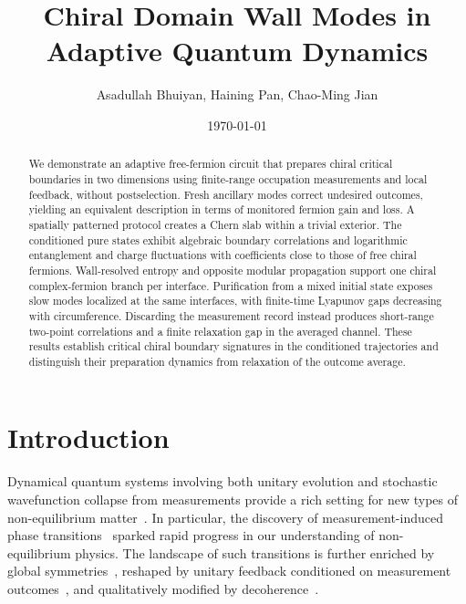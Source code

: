 \documentclass[aps,prb,10pt,twocolumn,superscriptaddress,longbibliography,floatfix]{revtex4-2}
\newcommand{\newtext}[1]{{\color{blue}#1}}
\begin{document}
\raggedbottom

\title{Chiral Domain Wall Modes in Adaptive Quantum Dynamics}
\author{Asadullah Bhuiyan, Haining Pan, Chao-Ming Jian}
\noaffiliation
\date{\today}

\begin{abstract}
\newtext{We demonstrate an adaptive free-fermion circuit that prepares chiral critical boundaries in two dimensions using finite-range occupation measurements and local feedback, without postselection. Fresh ancillary modes correct undesired outcomes, yielding an equivalent description in terms of monitored fermion gain and loss. A spatially patterned protocol creates a Chern slab within a trivial exterior. The conditioned pure states exhibit algebraic boundary correlations and logarithmic entanglement and charge fluctuations with coefficients close to those of free chiral fermions. Wall-resolved entropy and opposite modular propagation support one chiral complex-fermion branch per interface. Purification from a mixed initial state exposes slow modes localized at the same interfaces, with finite-time Lyapunov gaps decreasing with circumference. Discarding the measurement record instead produces short-range two-point correlations and a finite relaxation gap in the averaged channel. These results establish critical chiral boundary signatures in the conditioned trajectories and distinguish their preparation dynamics from relaxation of the outcome average.}
\end{abstract}

\maketitle

\setcounter{tocdepth}{2}
\tableofcontents

\section{Introduction}

Dynamical quantum systems involving both unitary evolution and stochastic wavefunction collapse from measurements provide a rich setting for new types of non-equilibrium matter~\cite{PotterVasseur2022,FisherKhemaniNahumVijay2023}.
In particular, the discovery of measurement-induced phase
transitions~\cite{LiChenFisher2018,SkinnerRuhmanNahum2019,ChanNandkishorePretkoSmith2019,LiChenFisher2019,GullansHuse2020}
sparked rapid progress in our understanding of non-equilibrium physics. The landscape of such transitions is further enriched by global symmetries~\cite{SangHsieh2021,BaoChoiAltman2021,LavasaniAlaviradBarkeshli2021,AgrawalEtAl2022,BarrattEtAl2022,MajidyEtAl2023}, reshaped by unitary feedback conditioned on measurement outcomes~\cite{IadecolaEtAl2023,RavindranathEtAl2023,PiroliEtAl2023,SierantTurkeshi2023,ODeaEtAl2024}, and qualitatively modified by
decoherence~\cite{WeinsteinBaoAltman2022,LiSangHsieh2023,LiuLiZhangJian2024,IvakiOjanenMoghaddam2025}.
\end{document}
